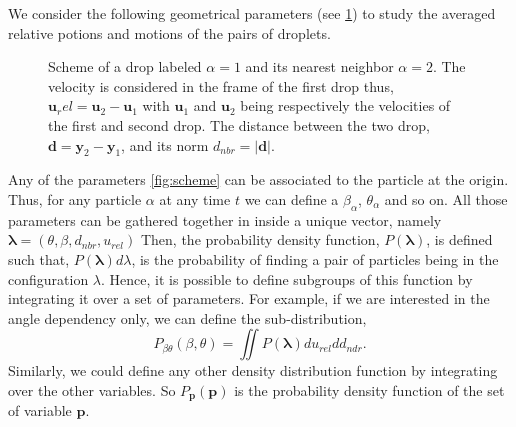 We consider the following geometrical parameters (see \ref{fig:para}) to study the averaged relative potions and motions of the pairs of droplets. 
\begin{figure}[h!]
    \centering
    \caption{Scheme of a drop labeled $\alpha =1$ and its nearest neighbor $\alpha = 2$. The velocity is considered in the frame of the first drop thus, $\bm{u}_rel =  \bm{u}_2-\bm{u}_1$ with $\bm{u}_1$ and $\bm{u}_2$ being respectively the velocities of the first and second drop. The distance between the two drop, $\bm{d} = \bm{y}_2 -\bm{y}_1$, and its norm $d_{nbr} = |\bm{d}|$. }
    \label{fig:para}
\end{figure}
Any of the parameters \ref{fig:scheme} can be associated to the particle at the origin. 
Thus, for any particle $\alpha$ at any time $t$ we can define a $\beta_{\alpha}$, $\theta_{\alpha}$ and so on. 
All those parameters can be gathered together in inside a unique vector, namely $\bm{\lambda} = (\theta,\beta,d_{nbr},u_{rel})$ 
Then, the probability density function, $P(\bm{\lambda})$, is defined such that, $P(\bm{\lambda})d\lambda$, is the probability of finding a pair of particles being in the configuration $\lambda$.  
Hence, it is possible to define subgroups of this function by integrating it over a set of parameters. 
For example, if we are interested in the angle dependency only, we can define the sub-distribution,
\begin{equation}
    P_{\beta\theta}(\beta,\theta) = \iint P(\bm{\lambda}) du_{rel} dd_{ndr}.
\end{equation}
Similarly, we could define any other density distribution function by integrating over the other variables.
So $P_{\bm{p}}(\bm{p})$ is the probability density function of the set of variable $\bm{p}$.
